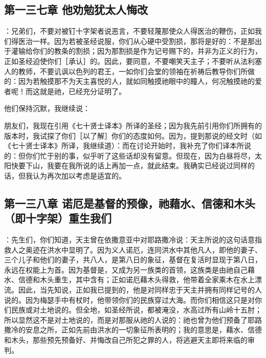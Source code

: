 
\subsection{第一三七章 他劝勉犹太人悔改}

：兄弟们，不要对被钉十字架者说恶言，不要轻蔑那使众人得医治的鞭伤，正如我们得医治一样。因为若被圣经说服，你们从心硬中受割损，那将是好的：不是那出于灌输给你们的教条的割损；因为那割损是作为记号赐下的，并非为正义的行为，正如圣经迫使你们［承认］的。因此，要同意，不要嘲笑天主子；不要听从法利塞人的教师，不要讥讽以色列的君王，一如你们会堂的领袖在祈祷后教导你们所做的：因为若触摸那不为天主喜悦的人，就如同触摸祂眼中的瞳人，何况触摸祂的爱者呢！而这就是祂，已经充分证明了。\par

他们保持沉默，我继续说：\par

朋友们，我现在引用《七十贤士译本》所译的圣经；因为我先前引用你们所拥有的版本时，我试探了你们［以了解］你们的态度如何。因为，提到那说的经文时（如《七十贤士译本》所译，我继续道）：而在讨论开始时，我补充了你们译本所说的：但你们忙于别的事，似乎听了这些话却没有留意。但现在，因为白昼将尽，太阳快要下山，我要在我所说的话上再加一点，就此结束。我确实已经说过同样的话，但我认为再次加以考虑是适宜的。\par


\subsection{第一三八章 诺厄是基督的预像，祂藉水、信德和木头（即十字架）重生我们}

：先生们，你们知道，天主曾在依撒意亚中对耶路撒冷说：天主所说的这句话意指救人之奥迹在洪水中显明了。因为义人诺厄，连同洪水中其他凡人，即他的妻子、三个儿子和他们的妻子，共八人，是第八日的象征，基督在复活时显现于第八日，永远在权能上为首。因为基督是，又成为另一族类的首领，这族类是由祂自己藉水、信德和木头重生，其中含有；正如诺厄藉木头得救，他带着全家乘木在水上漂流。因此，当先知说，正如我已提到的，他是对同样忠于天主并拥有同样记号的人说的。因为梅瑟手中有杖时，他带领你们的民族穿过大海。而你们相信这只是对你们民族或对土地说的。但全地，如圣经所说，都被淹没，水高过所有山岭十五肘；所以显然这不是对土地说的，而是对那服从祂的人说的：祂也曾为他们预备了耶路撒冷的安息之所，正如先前由洪水的一切象征所表明的；我的意思是，藉水、信德和木头，那些预先预备好、并悔改自己所犯之罪的人，将逃避天主即将来临的审判。\par

